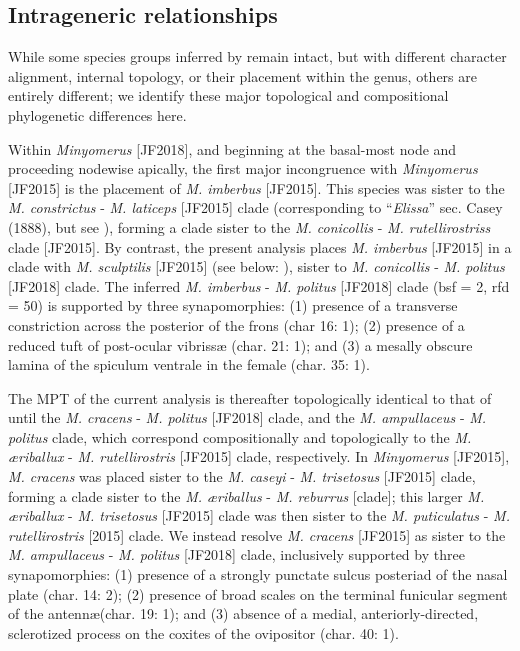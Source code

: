 \documentclass[fleqn,10pt,lineno]{wlpeerj} %
\begin{document}
	\subsection*{Intrageneric relationships}\label{ssec:diff}
		While some species groups inferred by \citet{jansen2015} remain intact, but with different character alignment, internal topology, or their placement within the genus, others are entirely different; we identify these major topological and compositional phylogenetic differences here.
		
		Within \textit{Minyomerus} [JF2018], and beginning at the basal-most node and proceeding nodewise apically, the first major incongruence with \textit{Minyomerus} [JF2015] is the placement of \textit{M. imberbus} [JF2015]. 
		This species was sister to the \textit{M. constrictus} - \textit{M. laticeps} [JF2015] clade (corresponding to ``\textit{Elissa}'' sec. Casey (1888), but see \citealt{jansen2015}), forming a clade sister to the \textit{M. conicollis} - \textit{M. rutellirostriss} clade [JF2015].
		By contrast, the present analysis places \textit{M. imberbus} [JF2015] in a clade with \textit{M. sculptilis} [JF2015] (see below: \textbf{}), sister to \textit{M. conicollis} - \textit{M. politus} [JF2018] clade.
		The inferred \textit{M. imberbus} - \textit{M. politus} [JF2018] clade (bsf = 2, rfd = 50) is supported by three synapomorphies: (1) presence of a transverse constriction across the posterior of the frons (char 16: 1); (2) presence of a reduced tuft of post-ocular vibriss{\ae} (char. 21: 1); and (3) a mesally obscure lamina of the spiculum ventrale in the female (char. 35: 1).
		
		The MPT of the current analysis is thereafter topologically identical to that of \citet{jansen2015} until the \textit{M. cracens} - \textit{M. politus} [JF2018] clade, and the \textit{M. ampullaceus} - \textit{M. politus} clade, which correspond compositionally and topologically to the \textit{M. {\ae}riballux} - \textit{M. rutellirostris} [JF2015] clade, respectively.
		In \textit{Minyomerus} [JF2015], \textit{M. cracens} was placed sister to the \textit{M. caseyi} - \textit{M. trisetosus} [JF2015] clade, forming a clade sister to the \textit{M. {\ae}riballus} - \textit{M. reburrus} [clade]; this larger \textit{M. {\ae}riballux} - \textit{M. trisetosus} [JF2015] clade was then sister to the \textit{M. puticulatus} - \textit{M. rutellirostris} [2015] clade.
		We instead resolve \textit{M. cracens} [JF2015] as sister to the \textit{M. ampullaceus} - \textit{M. politus} [JF2018] clade, inclusively supported by three synapomorphies: (1) presence of a strongly punctate sulcus posteriad of the nasal plate (char. 14: 2); (2) presence of broad scales on the terminal funicular segment of the antenn{\ae}(char. 19: 1); and (3) absence of a medial, anteriorly-directed, sclerotized process on the coxites of the ovipositor (char. 40: 1).
		
\end{document}
